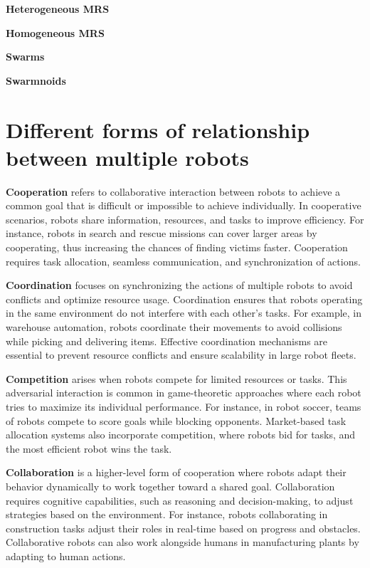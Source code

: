     \textbf{Heterogeneous MRS}
    
    \textbf{Homogeneous MRS}

    \textbf{Swarms} 

    \textbf{Swarmnoids}


\section{Different forms of relationship between multiple robots}

    \textbf{Cooperation} refers to collaborative interaction between robots to achieve a common goal that is difficult or impossible to achieve individually. In cooperative scenarios, robots share information, resources, and tasks to improve efficiency. For instance, robots in search and rescue missions can cover larger areas by cooperating, thus increasing the chances of finding victims faster. Cooperation requires task allocation, seamless communication, and synchronization of actions. \cite{parker-2008-distributed-intelligence-in-multi-robot-systems}
    
    \textbf{Coordination} focuses on synchronizing the actions of multiple robots to avoid conflicts and optimize resource usage. Coordination ensures that robots operating in the same environment do not interfere with each other’s tasks. For example, in warehouse automation, robots coordinate their movements to avoid collisions while picking and delivering items. Effective coordination mechanisms are essential to prevent resource conflicts and ensure scalability in large robot fleets. \cite{berman-2009-coordination-multiple-mobile-robots}
    
    \textbf{Competition} arises when robots compete for limited resources or tasks. This adversarial interaction is common in game-theoretic approaches where each robot tries to maximize its individual performance. For instance, in robot soccer, teams of robots compete to score goals while blocking opponents. Market-based task allocation systems also incorporate competition, where robots bid for tasks, and the most efficient robot wins the task. \cite{stone-2001-multi-agent-systems-survey}
    
    \textbf{Collaboration} is a higher-level form of cooperation where robots adapt their behavior dynamically to work together toward a shared goal. Collaboration requires cognitive capabilities, such as reasoning and decision-making, to adjust strategies based on the environment. For instance, robots collaborating in construction tasks adjust their roles in real-time based on progress and obstacles. Collaborative robots can also work alongside humans in manufacturing plants by adapting to human actions. \cite{breazeal-2019-collaborative-robots-human-aware-interaction}
    
